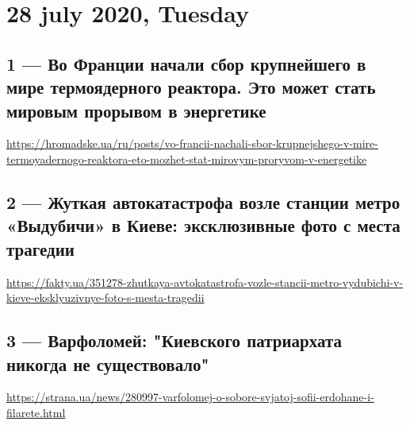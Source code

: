  

\section{28 july 2020, Tuesday}

\subsection{1 --- Во Франции начали сбор крупнейшего в мире термоядерного
реактора. Это может стать мировым прорывом в энергетике}

\url{https://hromadske.ua/ru/posts/vo-francii-nachali-sbor-krupnejshego-v-mire-termoyadernogo-reaktora-eto-mozhet-stat-mirovym-proryvom-v-energetike}

\subsection{2 --- Жуткая автокатастрофа возле станции метро «Выдубичи» в Киеве: эксклюзивные фото с места трагедии}
\url{https://fakty.ua/351278-zhutkaya-avtokatastrofa-vozle-stancii-metro-vydubichi-v-kieve-eksklyuzivnye-foto-s-mesta-tragedii}

\subsection{3 --- Варфоломей: "Киевского патриархата никогда не существовало"}
\url{https://strana.ua/news/280997-varfolomej-o-sobore-svjatoj-sofii-erdohane-i-filarete.html}

